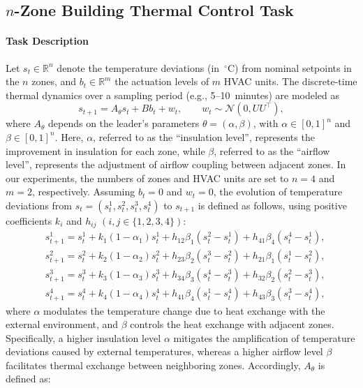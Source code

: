 \documentclass[letterpaper]{article} %
\begin{document}
\subsection{$n$-Zone Building Thermal Control Task
}\label{apdx:building_thermal_control}

\paragraph{Task Description}
Let $s_t\in\mathbb{R}^n$ denote the temperature deviations (in~$^\circ$C)
from nominal setpoints in the $n$ zones, and
$b_t\in\mathbb{R}^m$ the actuation levels of $m$ HVAC units.
The discrete-time thermal dynamics over a sampling period (e.g., 5--10~minutes)
are modeled as
\begin{equation}
    s_{t+1} = A_{\theta}s_t + Bb_t + w_t,
    \qquad w_t\sim\mathcal{N}(0,UU^\top),
\end{equation}
where $A_{\theta}$ depends on the leader's parameters
$\theta=(\alpha,\beta)$, with $\alpha\in[0,1]^n$ and $\beta\in[0,1]^n$. Here, $\alpha$, referred to as the ``insulation level'', represents the improvement in insulation for each zone, while
$\beta$, referred to as the ``airflow level'', represents the adjustment of airflow coupling between adjacent zones.
In our experiments, the numbers of zones and HVAC units are set to $n=4$ and $m=2$, respectively.
Assuming $b_t=0$ and $w_t=0$, the evolution of temperature deviations from $s_t=(s_t^1,s_t^2,s_t^3,s_t^4)$ to $s_{t+1}$ is defined as follows, using positive coefficients $k_i$ and $h_{ij}$ $(i,j\in\{1,2,3,4\})$:
\begin{align}
    &s_{t+1}^1 = s_t^1 + k_1(1-\alpha_1)s_t^1 + h_{12}\beta_1(s_t^2 - s_t^1) + h_{41}\beta_4(s_t^4 - s_t^1),\\
    &s_{t+1}^2 = s_t^2 + k_2(1-\alpha_2)s_t^2 + h_{23}\beta_2(s_t^3 - s_t^2) + h_{21}\beta_1(s_t^1 - s_t^2),\\
    &s_{t+1}^3 = s_t^3 + k_3(1-\alpha_3)s_t^3 + h_{34}\beta_3(s_t^4 - s_t^3) + h_{32}\beta_2(s_t^2 - s_t^3),\\
    &s_{t+1}^4 = s_t^4 + k_4(1-\alpha_4)s_t^4 + h_{41}\beta_4(s_t^1 - s_t^4) + h_{43}\beta_3(s_t^3 - s_t^4),
\end{align}
where $\alpha$ modulates the temperature change due to heat exchange with the external environment, and $\beta$ controls the heat exchange with adjacent zones.
Specifically, a higher insulation level $\alpha$ mitigates the amplification of temperature deviations caused by external temperatures, whereas a higher airflow level $\beta$ facilitates thermal exchange between neighboring zones.
Accordingly, $A_{\theta}$ is defined as:
\end{document}
